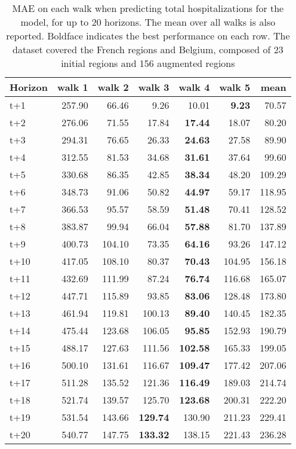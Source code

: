 \begin{table}[H]
\centering
\caption{MAE on each walk when predicting total hospitalizations for the model, for up to 20 horizons. The mean over all walks is also reported. Boldface indicates the best performance on each row. The dataset covered the French regions and Belgium, composed of 23 initial regions and 156 augmented regions }
\label{tab:MAE_walk_baseline}
\begin{tabular}{lrrrrrr}
\toprule
Horizon &  walk 1 &  walk 2 &  walk 3 &  walk 4 &  walk 5 &   mean \\
\midrule
t+1  & 257.90  & 66.46  & 9.26  & 10.01  & \textbf{9.23}  & 70.57  \\
t+2  & 276.06  & 71.55  & 17.84  & \textbf{17.44}  & 18.07  & 80.20  \\
t+3  & 294.31  & 76.65  & 26.33  & \textbf{24.63}  & 27.58  & 89.90  \\
t+4  & 312.55  & 81.53  & 34.68  & \textbf{31.61}  & 37.64  & 99.60  \\
t+5  & 330.68  & 86.35  & 42.85  & \textbf{38.34}  & 48.20  & 109.29  \\
t+6  & 348.73  & 91.06  & 50.82  & \textbf{44.97}  & 59.17  & 118.95  \\
t+7  & 366.53  & 95.57  & 58.59  & \textbf{51.48}  & 70.41  & 128.52  \\
t+8  & 383.87  & 99.94  & 66.04  & \textbf{57.88}  & 81.70  & 137.89  \\
t+9  & 400.73  & 104.10  & 73.35  & \textbf{64.16}  & 93.26  & 147.12  \\
t+10  & 417.05  & 108.10  & 80.37  & \textbf{70.43}  & 104.95  & 156.18  \\
t+11  & 432.69  & 111.99  & 87.24  & \textbf{76.74}  & 116.68  & 165.07  \\
t+12  & 447.71  & 115.89  & 93.85  & \textbf{83.06}  & 128.48  & 173.80  \\
t+13  & 461.94  & 119.81  & 100.13  & \textbf{89.40}  & 140.45  & 182.35  \\
t+14  & 475.44  & 123.68  & 106.05  & \textbf{95.85}  & 152.93  & 190.79  \\
t+15  & 488.17  & 127.63  & 111.56  & \textbf{102.58}  & 165.33  & 199.05  \\
t+16  & 500.10  & 131.61  & 116.67  & \textbf{109.47}  & 177.42  & 207.06  \\
t+17  & 511.28  & 135.52  & 121.36  & \textbf{116.49}  & 189.03  & 214.74  \\
t+18  & 521.74  & 139.57  & 125.70  & \textbf{123.68}  & 200.31  & 222.20  \\
t+19  & 531.54  & 143.66  & \textbf{129.74}  & 130.90  & 211.23  & 229.41  \\
t+20  & 540.77  & 147.75  & \textbf{133.32}  & 138.15  & 221.43  & 236.28  \\

\bottomrule
\end{tabular}
\end{table}
